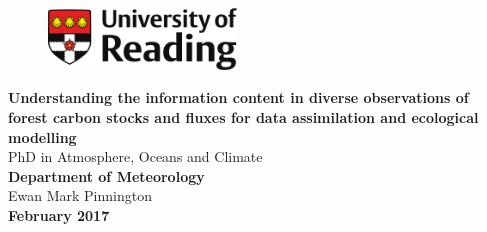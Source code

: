 
\begin{titlepage}
\begin{flushright}
\begin{figure}[h]
\begin{flushright}
  \vspace{-2cm}
\includegraphics[width=50mm]{preface/figures/reading_logo.pdf} %
\end{flushright}
\end{figure}
\end{flushright}
\begin{flushleft}
  \vspace{4cm}
\Huge{\bf{Understanding the information content in diverse observations of forest carbon stocks and fluxes for data assimilation and ecological modelling}}\\ %
\huge{PhD in Atmosphere, Oceans and Climate} \\ %
\Large{\bf{Department of Meteorology}}\\ %
\vspace{2cm}
\huge{Ewan Mark Pinnington} \\ %
\Large{\bf{February 2017}}\\ %
\end{flushleft}
\end{titlepage}


